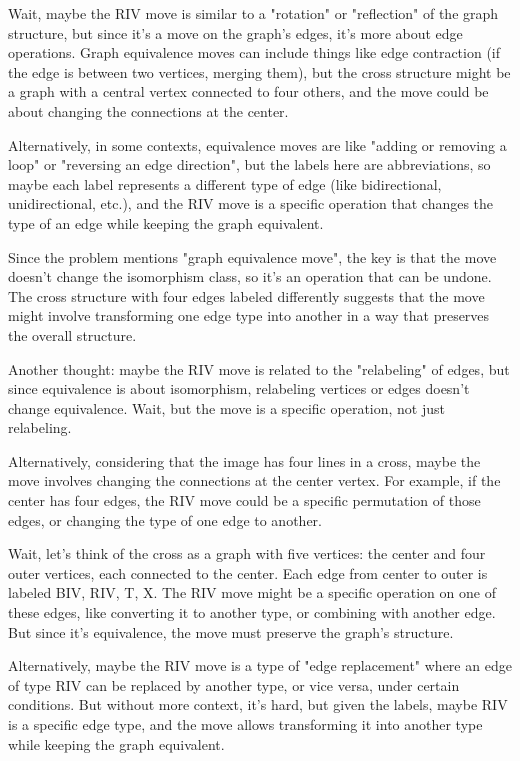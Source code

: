 Wait, maybe the RIV move is similar to a "rotation" or "reflection" of the graph structure, but since it's a move on the graph's edges, it's more about edge operations. Graph equivalence moves can include things like edge contraction (if the edge is between two vertices, merging them), but the cross structure might be a graph with a central vertex connected to four others, and the move could be about changing the connections at the center. 

Alternatively, in some contexts, equivalence moves are like "adding or removing a loop" or "reversing an edge direction", but the labels here are abbreviations, so maybe each label represents a different type of edge (like bidirectional, unidirectional, etc.), and the RIV move is a specific operation that changes the type of an edge while keeping the graph equivalent. 

Since the problem mentions "graph equivalence move", the key is that the move doesn't change the isomorphism class, so it's an operation that can be undone. The cross structure with four edges labeled differently suggests that the move might involve transforming one edge type into another in a way that preserves the overall structure. 

Another thought: maybe the RIV move is related to the "relabeling" of edges, but since equivalence is about isomorphism, relabeling vertices or edges doesn't change equivalence. Wait, but the move is a specific operation, not just relabeling. 

Alternatively, considering that the image has four lines in a cross, maybe the move involves changing the connections at the center vertex. For example, if the center has four edges, the RIV move could be a specific permutation of those edges, or changing the type of one edge to another. 

Wait, let's think of the cross as a graph with five vertices: the center and four outer vertices, each connected to the center. Each edge from center to outer is labeled BIV, RIV, T, X. The RIV move might be a specific operation on one of these edges, like converting it to another type, or combining with another edge. But since it's equivalence, the move must preserve the graph's structure. 

Alternatively, maybe the RIV move is a type of "edge replacement" where an edge of type RIV can be replaced by another type, or vice versa, under certain conditions. But without more context, it's hard, but given the labels, maybe RIV is a specific edge type, and the move allows transforming it into another type while keeping the graph equivalent. 

